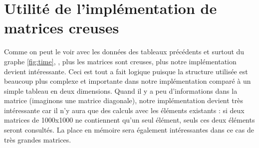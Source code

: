 \documentclass[a4paper]{scrartcl}
\begin{document}
\section{Utilité de l'implémentation de matrices creuses}
Comme on peut le voir avec les données des tableaux précédents et surtout du graphe \ref{fig:time}, , plus les matrices sont creuses, plus notre implémentation devient intéressante. Ceci est tout a fait logique puisque la structure utilisée est beaucoup plus complexe et importante dans notre implémentation comparé à un simple tableau en deux dimensions. Quand il y a peu d'informations dans la matrice (imaginons une matrice diagonale), notre implémentation devient très intéressante car il n'y aura que des calculs avec les éléments existants : si deux matrices de 1000x1000 ne contiennent qu'un seul élément, seuls ces deux éléments seront consultés. La place en mémoire sera également intéressantes dans ce cas de très grandes matrices.
\end{document}
